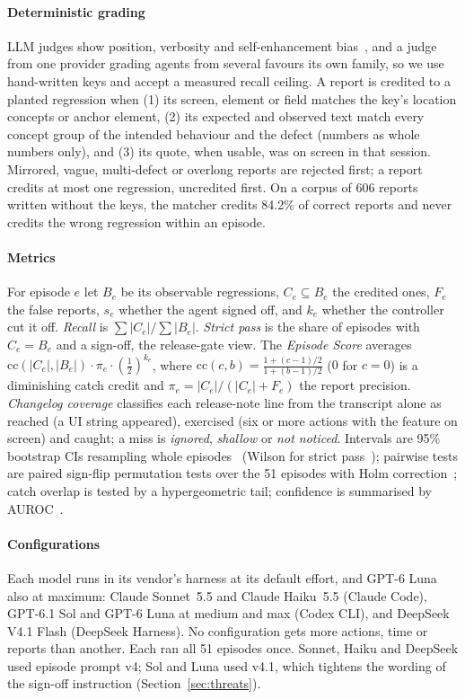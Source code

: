 \documentclass[10pt,letterpaper]{article}
\begin{document}
\paragraph{Deterministic grading}
LLM judges show position, verbosity and self-enhancement bias~\cite{zheng2023judge}, and a judge from
one provider grading agents from several favours its own family, so we use hand-written keys and
accept a measured recall ceiling. A report is credited to a planted regression when (1) its screen,
element or field matches the key's location concepts or anchor element, (2) its expected and observed
text match every concept group of the intended behaviour and the defect (numbers as whole numbers
only), and (3) its quote, when usable, was on screen in that session. Mirrored, vague, multi-defect
or overlong reports are rejected first; a report credits at most one regression, uncredited first.
On a corpus of 606 reports written without the keys, the matcher credits 84.2\% of correct reports and
never credits the wrong regression within an episode.

\paragraph{Metrics}
For episode $e$ let $B_e$ be its observable regressions, $C_e\subseteq B_e$ the credited ones, $F_e$
the false reports, $s_e$ whether the agent signed off, and $k_e$ whether the controller cut it off.
\emph{Recall} is $\sum|C_e|/\sum|B_e|$. \emph{Strict pass} is the share of episodes with $C_e=B_e$ and
a sign-off, the release-gate view. The \emph{Episode Score} averages
$\mathrm{cc}(|C_e|,|B_e|)\cdot\pi_e\cdot(\tfrac12)^{k_e}$, where $\mathrm{cc}(c,b)=\frac{1+(c-1)/2}{1+(b-1)/2}$
($0$ for $c=0$) is a diminishing catch credit and $\pi_e=|C_e|/(|C_e|+F_e)$ the report precision.
\emph{Changelog coverage} classifies each release-note line from the transcript alone as reached (a
UI string appeared), exercised (six or more actions with the feature on screen) and caught; a miss is
\emph{ignored}, \emph{shallow} or \emph{not noticed}. Intervals are 95\% bootstrap CIs resampling whole
episodes~\cite{efron1979} (Wilson for strict pass~\cite{wilson1927}); pairwise tests are paired
sign-flip permutation tests over the 51 episodes with Holm correction~\cite{holm1979}; catch overlap
is tested by a hypergeometric tail; confidence is summarised by AUROC~\cite{hanley1982auc}.

\paragraph{Configurations}
Each model runs in its vendor's harness at its default effort, and GPT-6 Luna also at maximum: Claude
Sonnet~5.5 and Claude Haiku~5.5 (Claude Code), GPT-6.1 Sol and GPT-6 Luna at medium and max (Codex
CLI), and DeepSeek V4.1 Flash (DeepSeek Harness). No configuration gets more actions, time or reports
than another. Each ran all 51 episodes once. Sonnet, Haiku and DeepSeek used episode prompt v4; Sol and
Luna used v4.1, which tightens the wording of the sign-off instruction (Section~\ref{sec:threats}).
\end{document}

